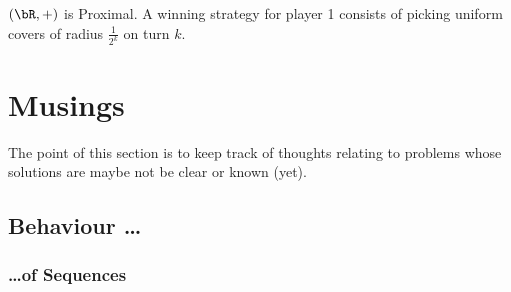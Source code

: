\documentclass{article}
\begin{document}
\begin{exam}
    \((\bR, +)\) is Proximal. A winning strategy for player 1 consists of picking uniform covers of radius \(\frac{1}{2^k}\) on turn \(k\).
\end{exam}

\section{Musings}
The point of this section is to keep track of thoughts relating to problems whose solutions are maybe not be clear or known (yet). 



\subsection{Behaviour \dots}

\subsubsection*{\dots of Sequences}
\end{document}

